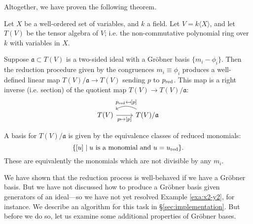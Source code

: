 Altogether, we have proven the following theorem.
\begin{thm}\label{thm:grobner-thm}
	Let $X$ be a well-ordered set of variables, and $k$ a field. Let $V = k\langle X \rangle$, and let $T(V)$ be the tensor algebra of $V$; i.e. the non-commutative polynomial ring over $k$ with variables in $X$.
	
	Suppose $\mathfrak{a} \subset T(V)$ is a two-sided ideal with a Gr\"obner basis $\{m_i - \phi_i\}$. Then the reduction procedure given by the congruences $m_i \equiv \phi_i$ produces a well-defined linear map $T(V)/\mathfrak{a} \to T(V)$ sending $p$ to $p_{\mathrm{red}}$. This map is a right inverse (i.e. section) of the quotient map $T(V) \to T(V)/\mathfrak{a}$:
	\[\begin{tikzcd}
	T(V) \arrow[r, "p \mapsto {[p]}",swap] & \arrow[l,bend right, swap," p_\red \mapsfrom {[p]}"] T(V)/\mathfrak{a}
	\end{tikzcd}\]
\end{thm}
\begin{cor}\label{cor:grobner}
	A basis for $T(V)/\mathfrak{a}$ is given by the equivalence classes of reduced monomials:
	\[
		\{[u] \mid u \textnormal{ is a monomial and }u = u_{\mathrm{red}}\}.
	\]
	These are equivalently the monomials which are not divisible by any $m_i$.
\end{cor}
We have shown that the reduction process is well-behaved if we have a Gr\"obner basis. But we have not discussed how to produce a Gr\"obner basis given generators of an ideal---so we have not yet resolved Example \ref{exa:x2-y2}, for instance. We describe an algorithm for this task in \S\ref{sec:implementation}. But before we do so, let us examine some additional properties of Gr\"obner bases.
